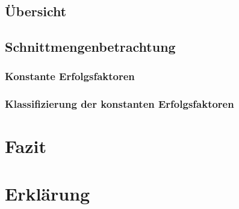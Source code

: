 \documentclass[12pt,a4paper,oneside]{article}
\newcommand{\EF}{Erfolgsfaktoren }
\begin{document}





















\subsection{Übersicht}

\subsection{Schnittmengenbetrachtung}
\subsubsection{Konstante \EF}
\subsubsection{Klassifizierung der konstanten \EF}

\section{Fazit}

\clearpage
{}
{}
\printbibliography[title=Literaturverzeichnis]

\clearpage
{}
{}
\section*{Erklärung}

\end{document}
